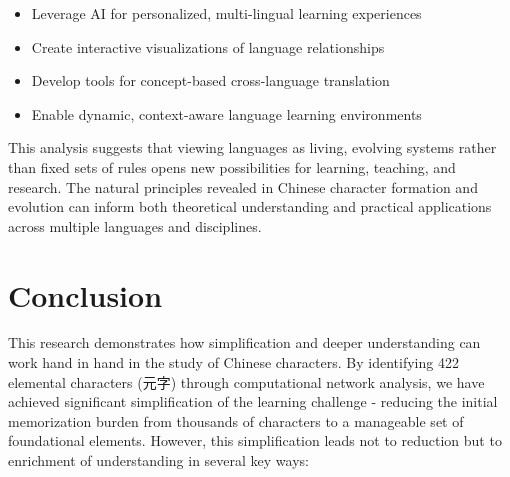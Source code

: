 \documentclass[11pt,letterpaper]{article}
\begin{document}
\begin{itemize}
\tightlist
\item
  Leverage AI for personalized, multi-lingual learning experiences
\item
  Create interactive visualizations of language relationships
\item
  Develop tools for concept-based cross-language translation
\item
  Enable dynamic, context-aware language learning environments
\end{itemize}

This analysis suggests that viewing languages as living, evolving
systems rather than fixed sets of rules opens new possibilities for
learning, teaching, and research. The natural principles revealed in
Chinese character formation and evolution can inform both theoretical
understanding and practical applications across multiple languages and
disciplines.

\section{Conclusion}\label{conclusion}

This research demonstrates how simplification and deeper understanding
can work hand in hand in the study of Chinese characters. By identifying
422 elemental characters (元字) through computational network analysis,
we have achieved significant simplification of the learning challenge -
reducing the initial memorization burden from thousands of characters to
a manageable set of foundational elements. However, this simplification
leads not to reduction but to enrichment of understanding in several key
ways:
\end{document}
